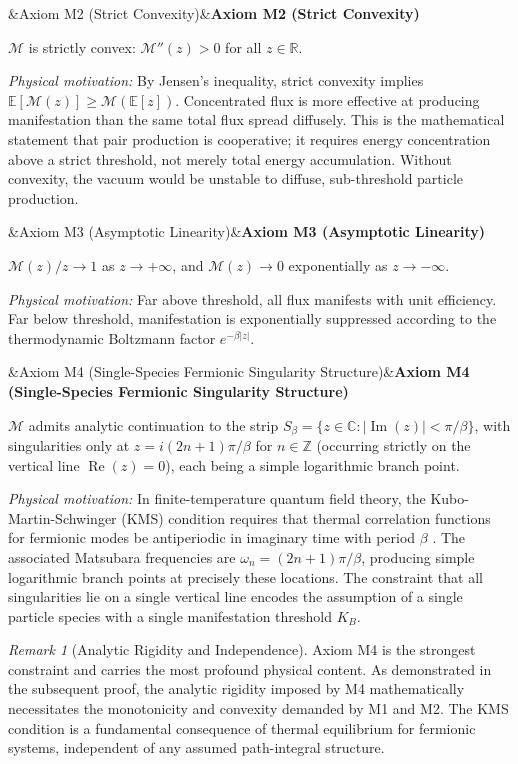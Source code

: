 \documentclass[12pt]{article}
\newcommand{\R}{\mathbb{R}}
\newcommand{\C}{\mathbb{C}}
\newcommand{\Z}{\mathbb{Z}}
\newcommand{\Man}{\mathcal{M}}
\DeclareMathOperator{\ReOp}{Re}
\DeclareMathOperator{\ImOp}{Im}
\theoremstyle{definition}
\theoremstyle{remark}
\newtheorem{remark}{Remark}[section]
\newenvironment{axiomatic}[1][]{%
  \begin{mdframed}[
    linewidth=1.5pt,
    linecolor=black,
    backgroundcolor=gray!8,
    roundcorner=4pt,
    innertopmargin=10pt,
    innerbottommargin=10pt,
    innerleftmargin=12pt,
    innerrightmargin=12pt,
  ]%
  \ifx&#1&\else\noindent\textsf{\textbf{#1}}\par\vspace{6pt}\fi
}{%
  \end{mdframed}%
}
\begin{document}
\begin{axiomatic}[Axiom M2 (Strict Convexity)]
$\Man$ is strictly convex: $\Man''(z) > 0$ for all $z \in \R$.

\vspace{4pt}
\noindent\textit{Physical motivation:} By Jensen's inequality, strict convexity implies $\mathbb{E}[\Man(z)] \geq \Man(\mathbb{E}[z])$. Concentrated flux is more effective at producing manifestation than the same total flux spread diffusely. This is the mathematical statement that pair production is cooperative; it requires energy concentration above a strict threshold, not merely total energy accumulation. Without convexity, the vacuum would be unstable to diffuse, sub-threshold particle production.
\end{axiomatic}

\begin{axiomatic}[Axiom M3 (Asymptotic Linearity)]
$\Man(z)/z \to 1$ as $z \to +\infty$, and $\Man(z) \to 0$ exponentially as $z \to -\infty$.

\vspace{4pt}
\noindent\textit{Physical motivation:} Far above threshold, all flux manifests with unit efficiency. Far below threshold, manifestation is exponentially suppressed according to the thermodynamic Boltzmann factor $e^{-\beta|z|}$.
\end{axiomatic}

\begin{axiomatic}[Axiom M4 (Single-Species Fermionic Singularity Structure)]
$\Man$ admits analytic continuation to the strip $S_\beta = \{z \in \C : |\ImOp(z)| < \pi/\beta\}$, with singularities only at $z = i(2n+1)\pi/\beta$ for $n \in \Z$ (occurring strictly on the vertical line $\ReOp(z) = 0$), each being a simple logarithmic branch point.

\vspace{4pt}
\noindent\textit{Physical motivation:} In finite-temperature quantum field theory, the Kubo-Martin-Schwinger (KMS) condition requires that thermal correlation functions for fermionic modes be antiperiodic in imaginary time with period $\beta$ \cite{KMS1957}. The associated Matsubara frequencies are $\omega_n = (2n+1)\pi/\beta$, producing simple logarithmic branch points at precisely these locations. The constraint that all singularities lie on a single vertical line encodes the assumption of a single particle species with a single manifestation threshold $K_B$.
\end{axiomatic}

\begin{remark}[Analytic Rigidity and Independence]
Axiom M4 is the strongest constraint and carries the most profound physical content. As demonstrated in the subsequent proof, the analytic rigidity imposed by M4 mathematically necessitates the monotonicity and convexity demanded by M1 and M2. The KMS condition is a fundamental consequence of thermal equilibrium for fermionic systems, independent of any assumed path-integral structure.
\end{remark}
\end{document}
